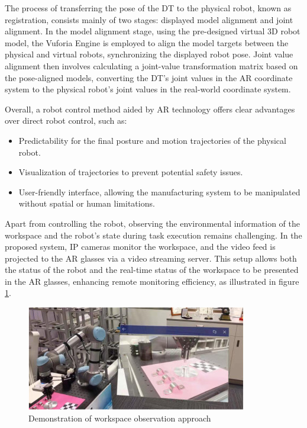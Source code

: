    The process of transferring the pose of the \ac{DT} to the physical robot, known as registration, consists mainly of two stages: displayed model alignment and joint alignment. In the model alignment stage, using the pre-designed virtual 3D robot model, the Vuforia Engine is employed to align the model targets between the physical and virtual robots, synchronizing the displayed robot pose. Joint value alignment then involves calculating a joint-value transformation matrix based on the pose-aligned models, converting the \ac{DT}'s joint values in the \ac{AR} coordinate system to the physical robot's joint values in the real-world coordinate system.


    Overall, a robot control method aided by \ac{AR} technology offers clear advantages over direct robot control, such as:
    \begin{itemize}
        \item Predictability for the final posture and motion trajectories of the physical robot.
        \item Visualization of trajectories to prevent potential safety issues.
        \item User-friendly interface, allowing the manufacturing system to be manipulated without spatial or human limitations.
    \end{itemize}

    Apart from controlling the robot, observing the environmental information of the workspace and the robot's state during task execution remains challenging. In the proposed system, IP cameras monitor the workspace, and the video feed is projected to the \ac{AR} glasses via a video streaming server. This setup allows both the status of the robot and the real-time status of the workspace to be presented in the \ac{AR} glasses, enhancing remote monitoring efficiency, as illustrated in figure \ref{f:workspace-visualization}.

    \begin{figure}[!htpb]
        \centering
        \includegraphics[width=0.7\linewidth]{figs/workspace-visualization.jpg}
        \caption{Demonstration of workspace observation approach \cite{LI2022102321}}
        \label{f:workspace-visualization}   
    \end{figure}
    \FloatBarrier


